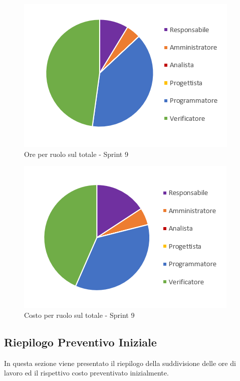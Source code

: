 \begin{figure}[H]
  \centering
  \includegraphics[scale=0.8]{immagini/9Sprint_oreRuolo.png}
  \caption{Ore per ruolo sul totale - Sprint 9}
\end{figure}

\begin{figure}[H]
  \centering
  \includegraphics[scale=0.8]{immagini/9Sprint_costoRuolo.png}
  \caption{Costo per ruolo sul totale - Sprint 9}
\end{figure}
\pagebreak

\subsection{Riepilogo Preventivo Iniziale} \label{subsection:preventivo_riepilogo}
In questa sezione viene presentato il riepilogo della suddivisione delle ore di lavoro ed il rispettivo costo preventivato inizialmente.

